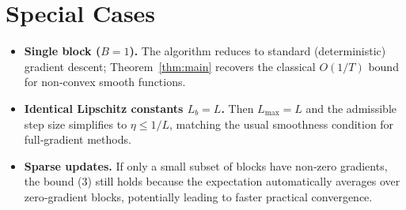 \documentclass{article}
\begin{document}
\section*{Special Cases}
\begin{itemize}
\item \textbf{Single block ($B=1$).}  The algorithm reduces to standard (deterministic) gradient descent; Theorem~\ref{thm:main} recovers the classical $O(1/T)$ bound for non‑convex smooth functions.
\item \textbf{Identical Lipschitz constants $L_{b}=L$.}  Then $L_{\max}=L$ and the admissible step size simplifies to $\eta\le 1/L$, matching the usual smoothness condition for full‑gradient methods.
\item \textbf{Sparse updates.}  If only a small subset of blocks have non‑zero gradients, the bound (3) still holds because the expectation automatically averages over zero‑gradient blocks, potentially leading to faster practical convergence.
\end{itemize}
\end{document}
